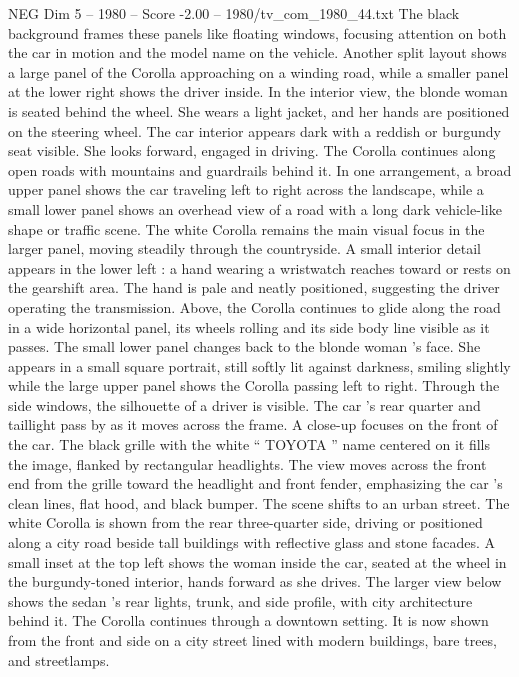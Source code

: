 \begin{textsample}{NEG Dim 5 – 1980 – Score -2.00 – 1980/tv\_com\_1980\_44.txt}
The black background frames these panels like floating windows, focusing attention on both the car in motion and the model name on the vehicle.
Another split layout shows a large panel of the Corolla approaching on a winding road, while a smaller panel at the lower right shows the driver inside.
In the interior view, the blonde woman is seated behind the wheel.
She wears a light jacket, and her hands are positioned on the steering wheel.
The car interior appears dark with a reddish or burgundy seat visible.
She looks forward, engaged in driving.
The Corolla continues along open roads with mountains and guardrails behind it.
In one arrangement, a broad upper panel shows the car traveling left to right across the landscape, while a small lower panel shows an overhead view of a road with a long dark vehicle-like shape or traffic scene.
The white Corolla remains the main visual focus in the larger panel, moving steadily through the countryside.
A small interior detail appears in the lower left : a hand wearing a wristwatch reaches toward or rests on the gearshift area.
The hand is pale and neatly positioned, suggesting the driver operating the transmission.
Above, the Corolla continues to glide along the road in a wide horizontal panel, its wheels rolling and its side body line visible as it passes.
The small lower panel changes back to the blonde woman ’s face.
She appears in a small square portrait, still softly lit against darkness, smiling slightly while the large upper panel shows the Corolla passing left to right.
Through the side windows, the silhouette of a driver is visible.
The car ’s rear quarter and taillight pass by as it moves across the frame.
A close-up focuses on the front of the car.
The black grille with the white “ TOYOTA ” name centered on it fills the image, flanked by rectangular headlights.
The view moves across the front end from the grille toward the headlight and front fender, emphasizing the car ’s clean lines, flat hood, and black bumper.
The scene shifts to an urban street.
The white Corolla is shown from the rear three-quarter side, driving or positioned along a city road beside tall buildings with reflective glass and stone facades.
A small inset at the top left shows the woman inside the car, seated at the wheel in the burgundy-toned interior, hands forward as she drives.
The larger view below shows the sedan ’s rear lights, trunk, and side profile, with city architecture behind it.
The Corolla continues through a downtown setting.
It is now shown from the front and side on a city street lined with modern buildings, bare trees, and streetlamps.

\end{textsample}
